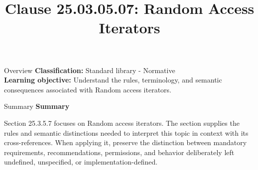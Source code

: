 \documentclass[10pt,letterpaper]{article}
\title{Clause 25.03.05.07: Random Access Iterators}
\author{}
\date{}
\begin{document}
\maketitle
\begin{CornellOverviewBox}{Overview}
\textbf{Classification:} Standard library - Normative\\[2pt]
\textbf{Learning objective:} Understand the rules, terminology, and semantic consequences associated with Random access iterators.
\end{CornellOverviewBox}\begin{CornellSummaryBox}{Summary}
{\sffamily\bfseries\color{Accent} Summary}\par\vspace{3pt}Section 25.3.5.7 focuses on Random access iterators. The section supplies the rules and semantic distinctions needed to interpret this topic in context with its cross-references. When applying it, preserve the distinction between mandatory requirements, recommendations, permissions, and behavior deliberately left undefined, unspecified, or implementation-defined.
\end{CornellSummaryBox}
\end{document}
